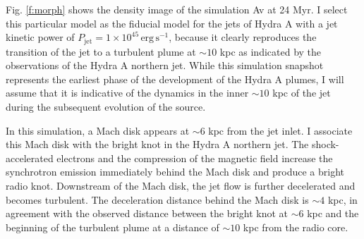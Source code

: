 

Fig. \ref{f:morph} shows the density image of the simulation Av at 24 Myr. I select this particular model as the fiducial model for the jets of Hydra A with a jet kinetic power of $P_\mathrm{jet}=1\times10^{45}\,\mathrm{erg}\,\mathrm{s}^{-1}$, because it clearly reproduces the transition of the jet to a turbulent plume at $\sim10$ kpc as indicated by the observations of the Hydra A northern jet. While this simulation snapshot represents the earliest phase of the development of the Hydra A plumes, I will assume that it is indicative of the dynamics in the inner $\sim10$ kpc of the jet during the subsequent evolution of the source. 

In this simulation, a Mach disk appears at $\sim6$ kpc from the jet inlet. I associate this Mach disk with the bright knot in the Hydra A northern jet. The shock-accelerated electrons and the compression of the magnetic field increase the synchrotron emission immediately behind the Mach disk and produce a bright radio knot. Downstream of the Mach disk, the jet flow is further decelerated and  becomes turbulent. The deceleration distance behind the Mach disk is $\sim 4$ kpc, in agreement with the observed distance between the bright knot at $\sim6$ kpc and the beginning of the turbulent plume at a distance of $\sim10$ kpc from the radio core. 

